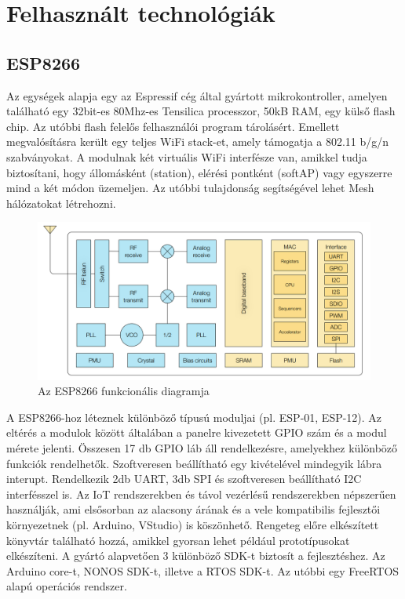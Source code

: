 



\chapter{Felhasznált technológiák}
\section{ESP8266}
Az egységek alapja egy az Espressif cég által gyártott mikrokontroller, amelyen található egy 32bit-es 80Mhz-es Tensilica processzor, 50kB RAM, egy külső flash chip. Az utóbbi flash felelős felhasználói program tárolásért. Emellett megvalósításra került egy teljes WiFi stack-et, amely támogatja a 802.11 b/g/n szabványokat. A modulnak két virtuális WiFi interfésze van, amikkel tudja biztosítani, hogy állomásként (station), elérési pontként (softAP) vagy egyszerre mind a két módon üzemeljen. Az utóbbi tulajdonság segítségével lehet Mesh hálózatokat létrehozni.

\begin{figure}[!ht]
    \centering
    \includegraphics[width=150mm, keepaspectratio]{figures/esp8266funcdiag.png}
    \caption{Az ESP8266 funkcionális diagramja \cite{esp8266:online} }
    \label{fig:TeXstudio}
\end{figure}

A ESP8266-hoz léteznek különböző típusú moduljai (pl. ESP-01, ESP-12). Az eltérés a modulok között általában a panelre kivezetett GPIO szám és a modul mérete jelenti. Összesen 17 db GPIO láb áll rendelkezésre, amelyekhez különböző funkciók rendelhetők. Szoftveresen beállítható egy kivételével mindegyik lábra interupt. Rendelkezik 2db UART, 3db SPI és szoftveresen beállítható I2C interfésszel is.
Az IoT rendszerekben és távol vezérlésű rendszerekben népszerűen használják, ami elsősorban az alacsony árának és a vele kompatibilis fejlesztői környezetnek (pl. Arduino, VStudio) is köszönhető. Rengeteg előre elkészített könyvtár található hozzá, amikkel gyorsan lehet például prototípusokat elkészíteni. A gyártó alapvetően 3 különböző SDK-t biztosít a fejlesztéshez. Az Arduino core-t, NONOS SDK-t, illetve a RTOS SDK-t. Az utóbbi egy FreeRTOS alapú operációs rendszer.

